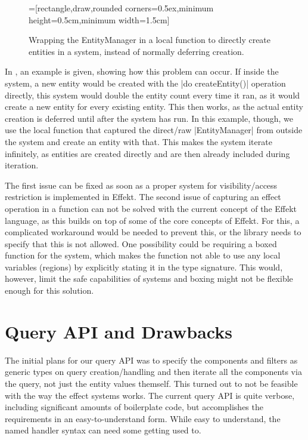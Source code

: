 \begin{figure}[h!]
\centering
{}=[rectangle,draw,rounded corners=0.5ex,minimum height=0.5cm,minimum width=1.5cm]
\caption{Wrapping the EntityManager in a local function to directly create entities in a system, instead of normally deferring creation.}
\label{fig:localfunctionwrap}
\end{figure}

In , an example is given, showing how this problem can occur. If inside the system, a new entity would be created with the |do createEntity()| operation directly, this system would double the entity count every time it ran, as it would create a new entity for every existing entity. This then works, as the actual entity creation is deferred until after the system has run. In this example, though, we use the local function that captured the direct/raw |EntityManager| from outside the system and create an entity with that. This makes the system iterate infinitely, as entities are created directly and are then already included during iteration.

The first issue can be fixed as soon as a proper system for visibility/access restriction is implemented in Effekt. The second issue of capturing an effect operation in a function can not be solved with the current concept of the Effekt language, as this builds on top of some of the core concepts of Effekt. For this, a complicated workaround would be needed to prevent this, or the library needs to specify that this is not allowed. One possibility could be requiring a boxed function for the system, which makes the function not able to use any local variables (regions) by explicitly stating it in the type signature. This would, however, limit the safe capabilities of systems and boxing might not be flexible enough for this solution.

\section{Query API and Drawbacks}

The initial plans for our query API was to specify the components and filters as generic types on query creation/handling and then iterate all the components via the query, not just the entity values themself. This turned out to not be feasible with the way the effect systems works. The current query API is quite verbose, including significant amounts of boilerplate code, but accomplishes the requirements in an easy-to-understand form. While easy to understand, the named handler syntax can need some getting used to.

